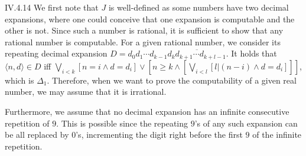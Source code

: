 \documentclass[12pt]{article}
\begin{document}
\begin{customthm}{IV.4.14}
  We first note that $J$ is well-defined as some numbers have two decimal expansions, where one could conceive that one expansion is computable and the other is not. Since such a number is rational, it is sufficient to show that any rational number is computable. For a given rational number, we consider its repeating decimal expansion $D=d_0d_1\cdots d_{k-1}\overline{d_kd_{k+1}\cdots d_{k+l-1}}$. It holds that $\langle n,d\rangle\in D$ iff $\bigvee_{i<k}[n=i\wedge d=d_i]\vee[n\geq k\wedge[\bigvee_{i<l}[l|(n-i)\wedge d=d_i]]]$, which is $\Delta_1$. Therefore, when we want to prove the computability of a given real number, we may assume that it is irrational.

  Furthermore, we assume that no decimal expansion has an infinite consecutive repetition of $9$. This is possible since the repeating $9$'s of any such expansion can be all replaced by $0$'s, incrementing the digit right before the first $9$ of the infinite repetition.


\end{customthm}
\end{document}
